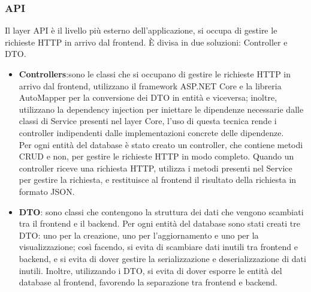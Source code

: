 \subsubsection{API}
Il layer API è il livello più esterno dell'applicazione, si occupa di gestire le richieste HTTP in arrivo dal frontend. È divisa in due soluzioni: Controller e DTO.\\
\begin{itemize}
    \item \textbf{Controllers}:sono le classi che si occupano di gestire le richieste HTTP in arrivo dal frontend, utilizzano il framework ASP.NET Core e la libreria AutoMapper per la conversione dei DTO in entità e viceversa; inoltre, utilizzano la dependency injection per iniettare le dipendenze necessarie dalle classi di Service presenti nel layer Core, l'uso di questa tecnica rende i controller indipendenti dalle implementazioni concrete delle dipendenze.\\
    Per ogni entità del database è stato creato un controller, che contiene metodi CRUD e non, per gestire le richieste HTTP in modo completo. Quando un controller riceve una richiesta HTTP, utilizza i metodi presenti nel Service per gestire la richiesta, e restituisce al frontend il risultato della richiesta in formato JSON.\\
    \item \textbf{DTO}: sono classi che contengono la struttura dei dati che vengono scambiati tra il frontend e il backend.
    Per ogni entità del database sono stati creati tre DTO: uno per la creazione, uno per l'aggiornamento e uno per la visualizzazione; così facendo, si evita di scambiare dati inutili tra frontend e backend, e si evita di dover gestire la serializzazione e deserializzazione di dati inutili. Inoltre, utilizzando i DTO, si evita di dover esporre le entità del database al frontend, favorendo la separazione tra frontend e backend.\\
\end{itemize}
